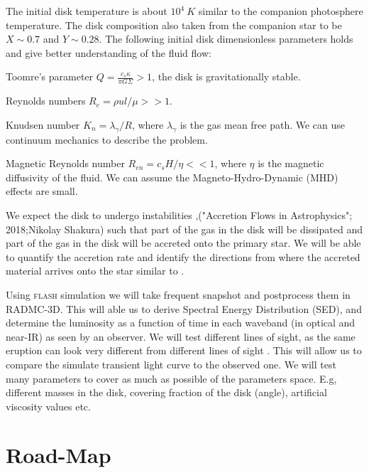 \documentclass[a4paper,12pt,modern]{aastex62}
\begin{document}
The initial disk temperature is about $10^4~K$ similar to the companion photosphere temperature. The disk composition also taken from the companion star to be $X\sim0.7$ and $Y\sim0.28$.
The following initial disk dimensionless parameters holds and give better understanding of the fluid flow: 
\begin{enumerate*}[label={(\alph*)}]
\item Toomre’s parameter \cite{1964ApJ...139.1217T} $Q=\frac{c_s\kappa}{\pi G \Sigma} > 1$, the disk is gravitationally stable.
\item Reynolds numbers $R_e=\rho u l / \mu>>1$.
\item Knudsen number $K_n=\lambda_\gamma / R$, where $\lambda_\gamma$ is the gas mean free path.  We can use continuum mechanics to describe the problem.
\item Magnetic Reynolds number $R_{en}= c_s H/ \eta <<1$, where $\eta$ is the magnetic diffusivity of the fluid.  We can assume the Magneto-Hydro-Dynamic (MHD) effects are small.
\end{enumerate*}

We expect the disk to undergo instabilities \citep{1988MNRAS.232....1F},("Accretion Flows in Astrophysics"; 2018;Nikolay Shakura) such that part of the gas in the disk will be dissipated and part of the gas in the disk will be accreted onto the primary star.
We will be able to quantify the accretion rate and identify the directions from where the accreted material arrives onto the star similar to \cite{2018arXiv180502529K,2018Galax...6...82K}.

Using \textsc{flash} simulation we will take frequent snapshot and postprocess them in RADMC-3D.
This will able us to derive Spectral Energy Distribution (SED), and determine the luminosity as a function of time in each waveband (in optical and near-IR) as seen by an observer.
We will test different lines of sight, as the same eruption can look very different from different lines of sight \cite{2017MNRAS.467.3299K}.
This will allow us to compare the simulate transient light curve to the observed one.
We will test many parameters to cover as much as possible of the parameters space. E.g, different masses in the disk, covering fraction of the disk (angle), artificial viscosity values etc.

\section{Road-Map}
\end{document}
